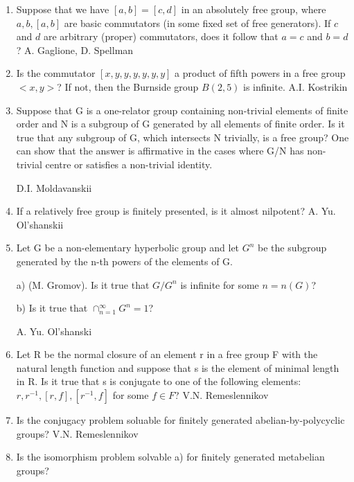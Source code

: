 \begin{enumerate}
\item
Suppose that we have $[a,b]=[c,d]$ in an absolutely free group,
where $a,b,[a,b]$ are basic commutators (in some fixed set of
free generators). If $c$ and $d$ are arbitrary (proper) commutators, does 
it follow that $a=c$ and $b=d$?
\medskip\noindent
A. Gaglione, D. Spellman
\item
Is the commutator  $[x,y,y,y,y,y,y]$  a product of fifth powers in a 
free group  $< x,y>$?   If not, then the  
Burnside group  $B(2,5)$ is infinite.
\medskip\noindent
A.I. Kostrikin

\item
Suppose that G is a one-relator group containing non-trivial 
elements of finite order and N is a  
subgroup of G generated by all elements of finite order.  
Is it true that any subgroup of G, which  
intersects N trivially, is a free group?  One can show that the answer 
is affirmative in the cases where G/N  
has non-trivial centre or satisfies a non-trivial identity.

\medskip\noindent
D.I. Moldavanskii

\item
If a relatively free group is finitely presented, is it almost nilpotent?
\medskip\noindent
A. Yu. Ol'shanskii


\item
Let G be a non-elementary hyperbolic group and let $G^n$
 be the subgroup generated by the n-th  
powers of the elements of G.

\noindent a) (M. Gromov).  Is it true that $G/G^n$  is infinite for some
$ n=n(G)$?

\noindent b)  Is it true that $\cap_{n=1}^{\infty}G^n=1$?

\medskip\noindent
A. Yu. Ol'shanski

\item
Let R be the normal closure of an element r  in a free group F 
with the natural length function and  
suppose that  s  is the element of minimal length in R.  
Is it true that  s  is conjugate to one of the  
following elements: $r, r^{-1}, [r,f], [r^{-1},f]$
for some $f \in F$?
\medskip\noindent							
V.N. Remeslennikov

\item 
Is the conjugacy problem soluable for finitely generated 
abelian-by-polycyclic groups?
\medskip\noindent
V.N. Remeslennikov

\item 
Is the isomorphism problem solvable
\noindent	
a) for finitely generated metabelian groups?


\end{enumerate}
